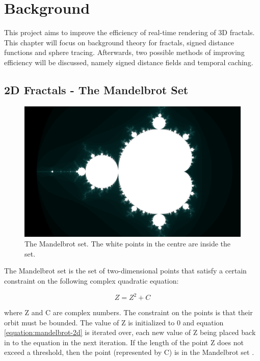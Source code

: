\chapter{Background}
\label{chapter:background}

This project aims to improve the efficiency of real-time rendering of 3D fractals. This chapter will focus on background theory for fractals, signed distance functions and sphere tracing. Afterwards, two possible methods of improving efficiency will be discussed, namely signed distance fields and temporal caching.

\section{2D Fractals - The Mandelbrot Set}

\begin{figure}[ht]
	\centering
	\includegraphics[width=0.65\linewidth, frame]{Images/Mandelbrot-2D-Full.png}
	\caption{The Mandelbrot set. The white points in the centre are inside the set.}
	\label{figure:mandelbrot-2d-full}
\end{figure}

The Mandelbrot set is the set of two-dimensional points that satisfy a certain constraint on the following complex quadratic equation:

\begin{equation} \label{equation:mandelbrot-2d}
	Z = {Z^2} + C
\end{equation}

where Z and C are complex numbers. The constraint on the points is that their orbit must be bounded. The value of Z is initialized to 0 and equation \ref{equation:mandelbrot-2d} is iterated over, each new value of Z being placed back in to the equation in the next iteration. If the length of the point Z does not exceed a threshold, then the point (represented by C) is in the Mandelbrot set \cite{devaney1999mandelbrot}.\newline

